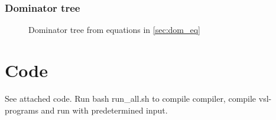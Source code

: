 \subsubsection{Dominator tree}
\begin{figure}[h]
    \centering
    
    \caption{Dominator tree from equations in \cref{sec:dom_eq}}
\end{figure}

\section{Code}
See attached code. Run bash run\_all.sh to compile compiler, compile vsl-programs and run with predetermined input.
